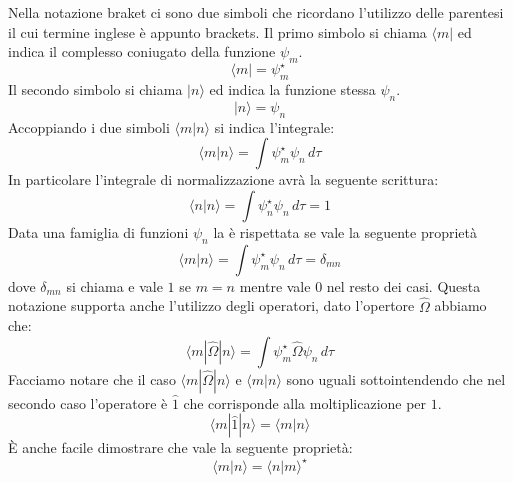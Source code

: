 Nella notazione braket ci sono due simboli che ricordano l'utilizzo delle parentesi il cui termine inglese è appunto brackets. Il primo simbolo si chiama  $\langle m |$ ed indica il complesso coniugato della funzione $\psi_m$.
$$\langle m | = \psi_m^{\star}$$
Il secondo simbolo si chiama  $| n \rangle$ ed indica la funzione stessa $\psi_n$.
$$| n \rangle = \psi_n$$
Accoppiando i due simboli $\langle m | n \rangle$ si indica l'integrale:
$$\langle m | n \rangle = \int \psi_m^{\star} \psi_n\, d\tau$$
In particolare l'integrale di normalizzazione avrà la seguente scrittura:
$$\langle n | n \rangle = \int \psi_n^{\star} \psi_n\, d\tau = 1$$
Data una famiglia di funzioni $\psi_n$ la  è rispettata se vale la seguente proprietà
$$\langle m | n \rangle = \int \psi_m^{\star} \psi_n\, d\tau = \delta_{mn}$$
dove $\delta_{mn}$ si chiama  e vale $1$ se $m = n$ mentre vale $0$ nel resto dei casi.
Questa notazione supporta anche l'utilizzo degli operatori, dato l'opertore $\hat{\Omega}$ abbiamo che:
$$\langle m | \hat{\Omega} | n \rangle = \int \psi_m^{\star} \hat{\Omega} \psi_n\, d\tau$$
Facciamo notare che il caso $\langle m | \hat{\Omega} | n \rangle$ e $\langle m | n \rangle$ sono uguali sottointendendo che nel secondo caso l'operatore è $\hat{1}$ che corrisponde alla moltiplicazione per $1$.
$$\langle m | \hat{1} | n \rangle = \langle m | n \rangle$$
È anche facile dimostrare che vale la seguente proprietà:
$$\langle m | n \rangle = {\langle n | m \rangle}^{\star}$$
